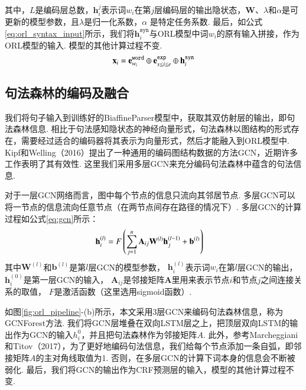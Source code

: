 其中，$L$是编码层总数，$\mathbf{h}_i^j$表示词$w_i$在第$j$层编码层的输出隐状态，$\mathbf{W}$、$\lambda$和$\alpha$是可更新的模型参数，且$\lambda$是归一化系数，$\alpha$ 是特定任务系数.
最后，如公式\ref{eq:orl_syntax_input}所示，我们将$\mathbf{h}_i^{\texttt{syn}}$与ORL模型中词$w_i$的原有输入拼接，作为ORL模型的输入. 模型的其他计算过程不变.
\begin{equation}
    \setlength{\abovedisplayskip}{9pt}
    \setlength{\belowdisplayskip}{9pt}
    \label{eq:orl_syntax_input}
    \mathbf{x}_i = \mathbf{e}_{w_i}^{\texttt{word}} \oplus \mathbf{e}_{s\leq i\leq e}^{\texttt{exp}} \oplus \mathbf{h}_i^{\texttt{syn}}
\end{equation}
\subsection{句法森林的编码及融合}
\label{sec:gcnforest}
我们将句子输入到训练好的BiaffineParser模型中，获取其双仿射层的输出，即句法森林信息.
相比于句法感知隐状态的神经向量形式，句法森林以图结构的形式存在，需要经过适合的编码器将其表示为向量形式，然后才能融入到ORL模型中.
Kipf和Welling（2016）提出了一种通用的编码图结构数据的方法GCN，近期许多工作表明了其有效性. 这里我们采用多层GCN来充分编码句法森林中蕴含的句法信息.

对于一层GCN网络而言，图中每个节点的信息只流向其邻居节点. 多层GCN可以将一节点的信息流向任意节点（在两节点间存在路径的情况下）. 多层GCN的计算过程如公式\ref{eq:gcn}所示：
\begin{equation}\label{eq:gcn}
    \setlength{\abovedisplayskip}{9pt}
    \setlength{\belowdisplayskip}{9pt}
    \begin{split}
        \mathbf{h}_i^{(l)} &= F\left(  \sum_{j=1}^n \mathbf{A}_{ij} \mathbf{W}^{(l)}\mathbf{h}_j^{(l-1)}+\mathbf{b}^{(l)} \right)
    \end{split}
\end{equation}
其中$\mathbf{W}^{(l)}$和$\mathbf{b}^{(l)}$是第$l$层GCN的模型参数， $\mathbf{h}_i^{(l)}$表示词$w_i$在第$l$层GCN的输出， $\mathbf{h}_i^{(0)}$是第一层GCN的输入， $\mathbf{A}_{ij}$是邻接矩阵$\mathbf{A}$里用来表示节点$i$和节点$j$之间连接关系的取值， $F$是激活函数（这里选用sigmoid函数）.

如图\ref{fig:orl_pipeline}-(b)所示，本文采用3层GCN来编码句法森林信息，称为GCNForest方法.
我们将GCN层堆叠在双向LSTM层之上，把顶层双向LSTM的输出作为GCN的输入$h_i^0$，并且把句法森林作为邻接矩阵$A$.
此外，参考Marcheggiani和Titov（2017），为了更好地编码句法信息，我们给每个节点添加一条自弧，即邻接矩阵$A$的主对角线取值为1. 否则，在多层GCN的计算下词本身的信息会不断被弱化. 最后，我们将GCN的输出作为CRF预测层的输入，模型的其他计算过程不变.

